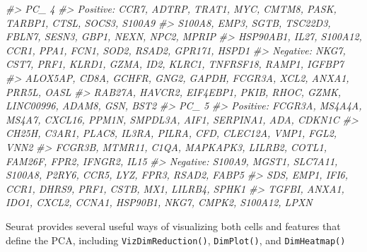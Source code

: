 \documentclass[
]{book}
\newenvironment{Shaded}{\begin{snugshade}}{\end{snugshade}}
\newcommand{\CommentTok}[1]{\textcolor[rgb]{0.56,0.35,0.01}{\textit{#1}}}
\begin{document}
\begin{Shaded}
\begin{Highlighting}[]
\CommentTok{\#\textgreater{} PC\_ 4 }
\CommentTok{\#\textgreater{} Positive:  CCR7, ADTRP, TRAT1, MYC, CMTM8, PASK, TARBP1, CTSL, SOCS3, S100A9 }
\CommentTok{\#\textgreater{}     S100A8, EMP3, SGTB, TSC22D3, FBLN7, SESN3, GBP1, NEXN, NPC2, MPRIP }
\CommentTok{\#\textgreater{}     HSP90AB1, IL27, S100A12, CCR1, PPA1, FCN1, SOD2, RSAD2, GPR171, HSPD1 }
\CommentTok{\#\textgreater{} Negative:  NKG7, CST7, PRF1, KLRD1, GZMA, ID2, KLRC1, TNFRSF18, RAMP1, IGFBP7 }
\CommentTok{\#\textgreater{}     ALOX5AP, CD8A, GCHFR, GNG2, GAPDH, FCGR3A, XCL2, ANXA1, PRR5L, OASL }
\CommentTok{\#\textgreater{}     RAB27A, HAVCR2, EIF4EBP1, PKIB, RHOC, GZMK, LINC00996, ADAM8, GSN, BST2 }
\CommentTok{\#\textgreater{} PC\_ 5 }
\CommentTok{\#\textgreater{} Positive:  FCGR3A, MS4A4A, MS4A7, CXCL16, PPM1N, SMPDL3A, AIF1, SERPINA1, ADA, CDKN1C }
\CommentTok{\#\textgreater{}     CH25H, C3AR1, PLAC8, IL3RA, PILRA, CFD, CLEC12A, VMP1, FGL2, VNN2 }
\CommentTok{\#\textgreater{}     FCGR3B, MTMR11, C1QA, MAPKAPK3, LILRB2, COTL1, FAM26F, FPR2, IFNGR2, IL15 }
\CommentTok{\#\textgreater{} Negative:  S100A9, MGST1, SLC7A11, S100A8, P2RY6, CCR5, LYZ, FPR3, RSAD2, FABP5 }
\CommentTok{\#\textgreater{}     SDS, EMP1, IFI6, CCR1, DHRS9, PRF1, CSTB, MX1, LILRB4, SPHK1 }
\CommentTok{\#\textgreater{}     TGFBI, ANXA1, IDO1, CXCL2, CCNA1, HSP90B1, NKG7, CMPK2, S100A12, LPXN}
\end{Highlighting}
\end{Shaded}

Seurat provides several useful ways of visualizing both cells and features that define the PCA, including \texttt{VizDimReduction()}, \texttt{DimPlot()}, and \texttt{DimHeatmap()}
\end{document}
